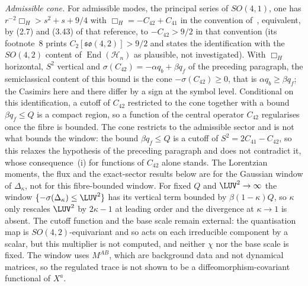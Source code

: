 \emph{Admissible cone.} For admissible modes, the principal series of \(SO(4,1)\), one has \(r^{-2}\Box_H>s^2+s+9/4\) with \(\Box_H=-C_{42}+C_{41}\) in the convention of~\cite{Steinacker2019NoGhost}, equivalent, by (2.7) and (3.43) of that reference, to \(-C_{42}>9/2\) in that convention (its footnote~8 prints \(C_2[\mathfrak{so}(4,2)]>9/2\) and states the identification with the \(SO(4,2)\) content of \(\operatorname{End}(\mathcal H_n)\) as plausible, not investigated). With \(\Box_H\) horizontal, \(S^2\) vertical and \(\sigma(C_{42})=-\alpha q_b+\beta q_f\) of the preceding paragraph, the semiclassical content of this bound is the cone \(-\sigma(C_{42})\ge0\), that is \(\alpha q_b\ge\beta q_f\); the Casimirs here and there differ by a sign at the symbol level. Conditional on this identification, a cutoff of \(C_{42}\) restricted to the cone together with a bound \(\beta q_f\le Q\) is a compact region, so a function of the central operator \(C_{42}\) regularises once the fibre is bounded. The cone restricts to the admissible sector and is not what bounds the window: the bound \(\beta q_f\le Q\) is a cutoff of \(S^2=2C_{41}-C_{42}\), so this relaxes the hypothesis of the preceding paragraph and does not contradict it, whose consequence~(i) for functions of \(C_{42}\) alone stands. The Lorentzian moments, the flux and the exact-sector results below are for the Gaussian window of \(\Delta_\kappa\), not for this fibre-bounded window. For fixed \(Q\) and \(\LUV^2\to\infty\) the window \(\{-\sigma(\Delta_\kappa)\le\LUV^2\}\) has its vertical term bounded by \(\beta(1-\kappa)Q\), so \(\kappa\) only rescales \(\LUV^2\) by \(2\kappa-1\) at leading order and the divergence at \(\kappa\to1\) is absent. The cutoff function and the base scale remain external: the quantisation map is \(SO(4,2)\)-equivariant and so acts on each irreducible component by a scalar, but this multiplier is not computed, and neither \(\chi\) nor the base scale is fixed. The window uses \(M^{AB}\), which are background data and not dynamical matrices, so the regulated trace is not shown to be a diffeomorphism-covariant functional of \(X^a\).




